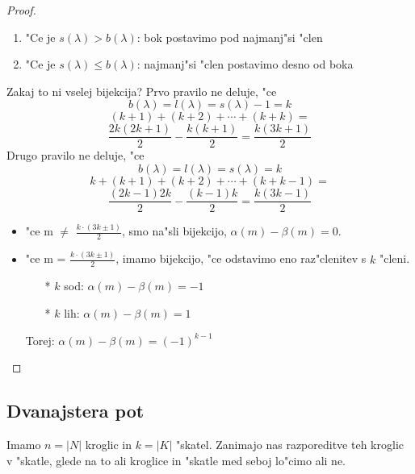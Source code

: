\documentclass[a4paper,12pt]{article}
\theoremstyle{definition}
\theoremstyle{remark}
\begin{document}
\begin{proof}
	\begin{enumerate}
	    \item "Ce je $s(\lambda) > b(\lambda)$: bok postavimo pod najmanj"si "clen
	    \item "Ce je $s(\lambda) \leqslant b(\lambda)$: najmanj"si "clen postavimo desno od boka
	\end{enumerate}

	Zakaj to ni vselej bijekcija? \label{TODO: add image 5} Prvo pravilo ne deluje, "ce
	\[b(\lambda) = l(\lambda) = s(\lambda) - 1 = k\]
	\label{TODO: add image 6}
	\[(k + 1) + (k + 2) + \cdots + (k + k) =\]
	\[\frac{2k (2k + 1)}{2} - \frac{k (k + 1)}{2} = \frac{k (3k + 1)}{2}\]
	Drugo pravilo ne deluje, "ce
	\[b(\lambda) = l(\lambda) = s(\lambda) = k\]
	\label{TODO: add image 7}
	\[k + (k + 1) + (k + 2) + \cdots + (k + k - 1) =\]
	\[\frac{(2k - 1) 2k}{2} - \frac{(k - 1) k}{2} = \frac{k (3k - 1)}{2}\]

	\begin{itemize}
	    \item "ce m $\neq$ $\frac{k \cdot (3k \pm 1)}{2}$, smo na"sli bijekcijo, $\alpha(m) - \beta(m) = 0$.
	    \item "ce m = $\frac{k \cdot (3k \pm 1)}{2}$, imamo bijekcijo, "ce odstavimo eno raz"clenitev s $k$ "cleni.
	    \begin{itemize}
	    	\item[*] $k$ sod: $\alpha(m) - \beta(m) = -1$
		    \item[*] $k$ lih: $\alpha(m) - \beta(m) = 1$
		\end{itemize}
	    Torej: $\alpha(m) - \beta(m) = (-1)^{k - 1}$
	\end{itemize}
\end{proof}
\label{TODO: add image 8}

\subsection{Dvanajstera pot}
Imamo $n = |N|$ kroglic in $k = |K|$ "skatel. Zanimajo nas razporeditve teh kroglic v "skatle, glede na to ali kroglice in "skatle med seboj lo"cimo ali ne.
\end{document}
